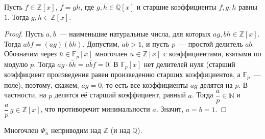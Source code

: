 \documentclass[12pt]{article}
\begin{document}
	\begin{lemma}\label{lem:gauss-monic}
		Пусть $f \in \mathbb{Z}[x]$, $f = g h$, где $g, h \in \mathbb{Q}[x]$ и старшие коэффициенты $f, g, h$ равны $1$. Тогда $g, h \in \mathbb{Z}[x]$.
	\end{lemma}
	\begin{proof}
		Пусть $a, b$~--- наименьшие натуральные числа, для которых $ag, bh \in \mathbb{Z}[x]$. Тогда $ab f = (ag)(bh)$. Допустим, $ab > 1$, и пусть $p$~--- простой делитель $ab$. Обозначим через $\overline{u} \in \mathbb{F}_p[x]$ многочлен $u \in \mathbb{Z}[x]$ с коэффициентами, взятыми по модулю $p$. Тогда $\overline{ag} \cdot \overline{bh} = \overline{abf} = 0$. В $\mathbb{F}_p[x]$ нет делителей нуля (старший коэффициент произведения равен произведению старших коэффициентов, а $\mathbb{F}_p$~--- поле), поэтому, скажем, $\overline{ag} = 0$, то есть все коэффициенты $ag$ делятся на $p$. В частности, на $p$ делится её старший коэффициент, равный $a$. Тогда $\dfrac{a}{p} \in \mathbb{N}$ и $\dfrac{a}{p}\,g \in \mathbb{Z}[x]$, что противоречит минимальности $a$. Значит, $a = b = 1$.
	\end{proof}

	\begin{theorem}\label{thm:cyclotomic-irreducible}
		Многочлен $\Phi_n$ неприводим над $\mathbb{Z}$ (и над $\mathbb{Q}$).
	\end{theorem}
\end{document}

